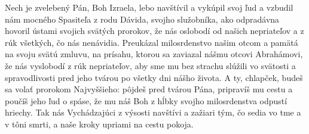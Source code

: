 Nech je zvelebený Pán, Boh Izraela,
lebo navštívil a vykúpil svoj ľud
\versseparator
a vzbudil nám mocného Spasiteľa
z rodu Dávida, svojho služobníka,
\versseparator
ako odpradávna hovoril
ústami svojich svätých prorokov,
\versseparator
že nás oslobodí od našich nepriateľov
a z rúk všetkých, čo nás nenávidia.
\versseparator
Preukázal milosrdenstvo našim otcom
a pamätá na svoju svätú zmluvu,
\versseparator
na prísahu, ktorou sa zaviazal nášmu otcovi Abrahámovi,
že nás vyslobodí z rúk nepriateľov,
\versseparator
aby sme mu bez strachu slúžili
\versseparator
vo svätosti a spravodlivosti pred jeho tvárou
po všetky dni nášho života.
\versseparator
A ty, chlapček, budeš sa volať prorokom Najvyššieho:
pôjdeš pred tvárou Pána, pripravíš mu cestu
\versseparator
a poučíš jeho ľud o spáse,
\versseparator
že mu náš Boh
z hĺbky svojho milosrdenstva odpustí hriechy.
Tak nás Vychádzajúci z výsosti navštívi
\versseparator
a zažiari tým, čo sedia vo tme a v tôni smrti,
a naše kroky upriami na cestu pokoja.

